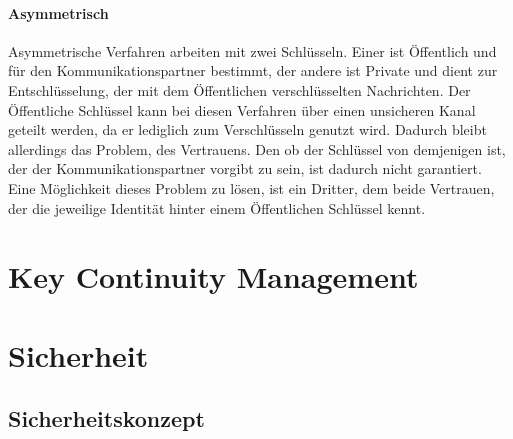 \documentclass[11pt,a4paper]{report}
\begin{document}
\paragraph{Asymmetrisch}

Asymmetrische Verfahren arbeiten mit zwei Schlüsseln. Einer ist Öffentlich und für den Kommunikationspartner bestimmt, der andere ist Private und dient zur Entschlüsselung, der mit dem Öffentlichen verschlüsselten Nachrichten. Der Öffentliche Schlüssel kann bei diesen Verfahren über einen unsicheren Kanal geteilt werden, da er lediglich zum Verschlüsseln genutzt wird. Dadurch bleibt allerdings das Problem, des Vertrauens. Den ob der Schlüssel von demjenigen ist, der der Kommunikationspartner vorgibt zu sein, ist dadurch nicht garantiert. Eine Möglichkeit dieses Problem zu lösen, ist ein Dritter, dem beide Vertrauen, der die jeweilige Identität hinter einem Öffentlichen Schlüssel kennt.

\section{Key Continuity Management}

\section{Sicherheit}

\subsection{Sicherheitskonzept} \label{sec:security_conzept}
\end{document}

